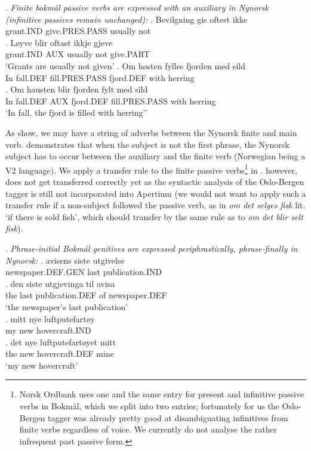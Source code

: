 \documentclass[11pt]{article}
\begin{document}
\setlength{\Exlabelsep}{1.1em} %
\alignSubExtrue %
\ex. \label{pass} \emph{Finite bokmål passive verbs are expressed with an auxiliary
  in Nynorsk (infinitive passives remain unchanged):}
\ag. Bevilgning gis oftest ikke\\
grant.IND give.PRES.PASS usually not\\
\bg. Løyve blir oftast ikkje gjeve\\
grant.IND AUX usually not give.PART \\
`Grants are usually not given'
\cg. Om høsten fylles fjorden med sild\\
In fall.DEF fill.PRES.PASS fjord.DEF with herring\\
\label{pass-syntax}
\dg. Om hausten blir fjorden fylt med sild\\
In fall.DEF AUX fjord.DEF fill.PRES.PASS with herring\\ 
`In fall, the fjord is filled with herring''

As \Last[a-b] show, we may have a string of adverbs between the
Nynorsk finite and main verb. \Last[c-d] demonstrates that when the
subject is not the first phrase, the Nynorsk subject has to occur
between the auxiliary and the finite verb (Norwegian being a V2
language). We apply a transfer rule to the finite passive
verbs\footnote{Norsk Ordbank uses
  one and the same entry for present and infinitive passive verbs in
  Bokmål, which we split into two entries; fortunately for us the
  Oslo-Bergen tagger was already pretty good at disambiguating
  infinitives from finite verbs regardless of voice. We currently
  do not analyse the
  rather infrequent past passive form.} in \Last[a-b]. \Last[c-d]
however, does not get transferred correctly yet as the syntactic
analysis of the Oslo-Bergen tagger is still not incorporated into
Apertium (we would not want to apply such a transfer rule if a
non-subject followed the passive verb, as in \emph{om det selges fisk}
lit. `if there is sold fish', which should transfer by the same rule
as \Last[a-b] to \emph{om det
  blir selt fisk}).

\ex. \label{posgen} \emph{Phrase-initial Bokmål genitives are expressed
  periphrastically, phrase-finally in Nynorsk:}
\ag. avisens siste utgivelse\\
newspaper.DEF.GEN last publication.IND\\
\bg. den siste utgjevinga til avisa\\
the last publication.DEF of newspaper.DEF\\
`the newspaper's last publication'\\
\cg. mitt nye luftputefartøy\\
my new hovercraft.IND\\
\dg. det nye luftputefartøyet mitt\\
the new hovercraft.DEF mine\\
`my new hovercraft'
\end{document}
